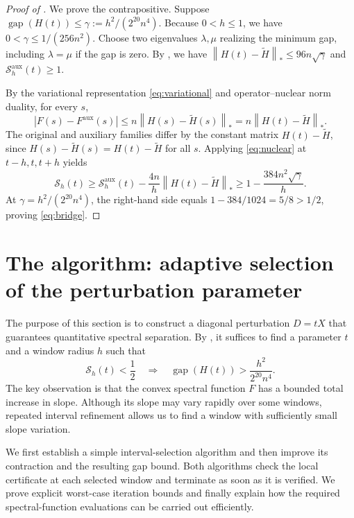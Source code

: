 \documentclass[10pt,a4paper]{article}
\newcommand{\norm}[1]{\left\lVert #1\right\rVert}
\DeclareMathOperator{\gap}{gap}
\begin{document}
\begin{proof}[Proof of ]
We prove the contrapositive. Suppose
$\gap(H(t))\leq\gamma:=h^2/(2^{20}n^4)$.
Because $0<h\leq1$, we have $0<\gamma\leq1/(256n^2)$.
Choose two eigenvalues $\lambda,\mu$ realizing the minimum gap,
including $\lambda=\mu$ if the gap is zero. By
, we have
$\norm{H(t)-\widetilde H}_*\leq96n\sqrt\gamma$ and
$\mathcal S_h^{\mathrm{aux}}(t)\geq1$.

By the variational representation \eqref{eq:variational}
and operator--nuclear norm duality, for every $s$,
\begin{equation}\label{eq:nuclear}
\boxed{
|F(s)-F^{\mathrm{aux}}(s)|
\leq n\norm{H(s)-\widetilde H(s)}_*
=n\norm{H(t)-\widetilde H}_*.
}
\end{equation}
The original and auxiliary families differ by the constant matrix
$H(t)-\widetilde H$, since
$H(s)-\widetilde H(s)=H(t)-\widetilde H$ for all $s$.
Applying \eqref{eq:nuclear} at $t-h,t,t+h$ yields
\[
\mathcal S_h(t)\geq\mathcal S_h^{\mathrm{aux}}(t)
-\frac{4n}{h}\norm{H(t)-\widetilde H}_*
\geq1-\frac{384n^2\sqrt\gamma}{h}.
\]
At $\gamma=h^2/(2^{20}n^4)$, the right-hand side equals
$1-384/1024=5/8>1/2$, proving \eqref{eq:bridge}.
\end{proof}

\section{The algorithm: adaptive selection of the perturbation parameter}
\label{sec:selection}

The purpose of this section is to construct a diagonal
perturbation $D=tX$ that guarantees quantitative spectral
separation. By , it suffices to find
a parameter $t$ and a window radius $h$ such that
\[
\mathcal S_h(t)<\frac12
\quad\Longrightarrow\quad
\gap(H(t))>\frac{h^2}{2^{20}n^4}.
\]
The key observation is that the convex spectral function
$F$ has a bounded total increase in slope. Although its
slope may vary rapidly over some windows, repeated interval
refinement allows us to find a window with sufficiently
small slope variation.


We first establish a simple interval-selection algorithm
and then improve its contraction and the resulting gap
bound. Both algorithms check the local certificate at
each selected window and terminate as soon as it is
verified. We prove explicit worst-case iteration bounds
and finally explain how the required spectral-function
evaluations can be carried out efficiently.
\end{document}
